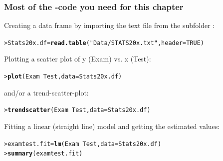 \documentclass{beamer}\usepackage[]{graphicx}\usepackage[]{xcolor}
\makeatletter
\newcommand{\hlnum}[1]{\textcolor[rgb]{0.686,0.059,0.569}{#1}}%
\newcommand{\hlstr}[1]{\textcolor[rgb]{0.192,0.494,0.8}{#1}}%
\newcommand{\hlopt}[1]{\textcolor[rgb]{0,0,0}{#1}}%
\newcommand{\hlstd}[1]{\textcolor[rgb]{0.345,0.345,0.345}{#1}}%
\newcommand{\hlkwb}[1]{\textcolor[rgb]{0.69,0.353,0.396}{#1}}%
\newcommand{\hlkwc}[1]{\textcolor[rgb]{0.333,0.667,0.333}{#1}}%
\newcommand{\hlkwd}[1]{\textcolor[rgb]{0.737,0.353,0.396}{\textbf{#1}}}%
\newenvironment{kframe}{%
 \def\at@end@of@kframe{}%
 \ifinner\ifhmode%
  \def\at@end@of@kframe{\end{minipage}}%
  \begin{minipage}{\columnwidth}%
 \fi\fi%
 \def\FrameCommand##1{\hskip\@totalleftmargin \hskip-\fboxsep
 \colorbox{shadecolor}{##1}\hskip-\fboxsep
     \hskip-\linewidth \hskip-\@totalleftmargin \hskip\columnwidth}%
 \MakeFramed {\advance\hsize-\width
   \@totalleftmargin\z@ \linewidth\hsize
   \@setminipage}}%
 {\par\unskip\endMakeFramed%
 \at@end@of@kframe}
\newenvironment{knitrout}{}{} %
\makeatother
\begin{document}
\begin{frame}[fragile]
\frametitle{Most of the -code you need for this chapter}


Creating a data frame by importing the text file  from the subfolder :

\begin{knitrout}\scriptsize
{}\color{fgcolor}\begin{kframe}
\begin{alltt}
\hlstd{> }\hlstd{Stats20x.df} \hlkwb{=} \hlkwd{read.table}\hlstd{(}\hlstr{"Data/STATS20x.txt"}\hlstd{,} \hlkwc{header}\hlstd{=}\hlnum{TRUE}\hlstd{)}
\end{alltt}
\end{kframe}
\end{knitrout}

Plotting a scatter plot of y (Exam) vs. x  (Test):

\begin{knitrout}\scriptsize
{}\color{fgcolor}\begin{kframe}
\begin{alltt}
\hlstd{> }\hlkwd{plot}\hlstd{(Exam}\hlopt{~}\hlstd{Test,} \hlkwc{data}\hlstd{=Stats20x.df)}
\end{alltt}
\end{kframe}
\end{knitrout}

and/or a trend-scatter-plot:

\begin{knitrout}\scriptsize
{}\color{fgcolor}\begin{kframe}
\begin{alltt}
\hlstd{> }\hlkwd{trendscatter}\hlstd{(Exam} \hlopt{~}\hlstd{Test,} \hlkwc{data} \hlstd{= Stats20x.df)}
\end{alltt}
\end{kframe}
\end{knitrout}


Fitting a linear (straight line) model and getting the estimated values:


\begin{knitrout}\scriptsize
{}\color{fgcolor}\begin{kframe}
\begin{alltt}
\hlstd{> }\hlstd{examtest.fit}\hlkwb{=}\hlkwd{lm}\hlstd{(Exam}\hlopt{~}\hlstd{Test,} \hlkwc{data}\hlstd{=Stats20x.df)}
\hlstd{> }\hlkwd{summary}\hlstd{(examtest.fit)}
\end{alltt}
\end{kframe}
\end{knitrout}


\end{frame}
\end{document}
